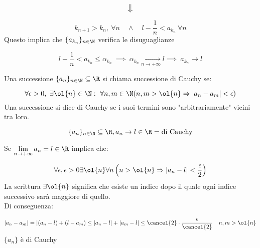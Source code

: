 \documentclass[../analisi.tex]{subfiles}
\begin{document}
\begin{dimo}
\begin{equation*}
	\big\Downarrow
\end{equation*}

\begin{equation}
	k_{n+1} > k_n, \ \forall n \quad \land \quad 
	l - \frac{1}{n} < a_{k_n}\ \forall n
\end{equation}
Questo implica che $ \{ a_{k_n} \}_{n \in \N}$ verifica le disuguaglianze

\begin{equation}
	l - \frac{1}{n} < a_{k_n} \leq \alpha_{k_n}\ \implies\ 
	\alpha_{k_n} \underset{n \to + \infty}{\to} l \implies\
	a_{k_n} \to l
\end{equation}

\end{dimo}

\begin{defn}
	Una successione $ \{ a_n \}_{n \in \N} \subseteq \R $ si chiama successione di Cauchy se:

\begin{equation}
	\forall \epsilon > 0,\ \exists \ol{n} \in \N:\ \forall n,m \in \N 
	(n,m > \ol{n} \Rightarrow | a_n - a_m | < \epsilon )
\end{equation}
Una successione si dice di Cauchy se i suoi termini sono "arbitrariamente" vicini tra loro.
\end{defn}

\begin{defn}

\begin{equation}
	\{ a_n \}_{n \in \N} \subseteq \R, a_n \to l \in \R = \mbox{di Cauchy}
\end{equation}
\end{defn}

\begin{dimo} 
Se $ \lim \limits_{n \to + \infty} a_n = l \in \R $ implica che:

\begin{equation}
	\forall \epsilon, \epsilon > 0 \exists \ol{n} \forall n 
	\left( n > \ol{n} \Rightarrow | a_n - l | < \frac{\epsilon}{2} \right)
\end{equation}
La scrittura $ \exists \ol{n} $ significa che esiste un indice dopo il quale 
ogni indice successivo sarà maggiore di quello.\\
Di conseguenza:

\begin{equation}
	| a_n - a_m | = | (a_n - l) + (l - a_m) \leq 
	| a_n - l | + | a_m - l | \leq \cancel{2} \cdot \frac{\epsilon}{\cancel{2}}
	\quad n,m > \ol{n}
\end{equation}
$ \{ a_n \} $ è di Cauchy 
\end{dimo}
\end{document}
